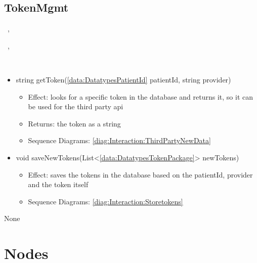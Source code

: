   \subsection{TokenMgmt}\label{int:InterfacesTokenMgmt}
    \begin{description}
      \item[Provided by:] \iconcomponent{}~, \iconcomponent{}~
      \item[Required by:] \iconcomponent{}~, \iconcomponent{}~ 
      \item[Operations:] ~
    \begin{itemize}[noitemsep,nolistsep,leftmargin=-.25cm]
      \item \textsf{string getToken(\ref{data:DatatypesPatientId} patientId, string provider)}
        \begin{itemize}[noitemsep,nolistsep]
           \item Effect: looks for a specific token in the database and returns it, so it can be used for the third party api 
           \item Returns: the token as a string
           \item Sequence Diagrams: \cref{diag:Interaction:ThirdPartyNewData}
        \end{itemize}
      \item \textsf{void saveNewTokens(List\textless{}\ref{data:DatatypesTokenPackage}\textgreater{} newTokens)}
        \begin{itemize}[noitemsep,nolistsep]
           \item Effect: saves the tokens in the database based on the patientId, provider and the token itself 
           \item Sequence Diagrams: \cref{diag:Interaction:Storetokens}
        \end{itemize}
    \end{itemize}
      \item[Diagrams:] None
    \end{description}


\section{Nodes}\label{sec:nodes}
